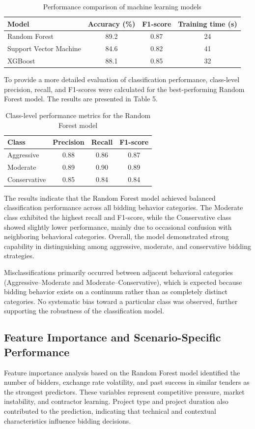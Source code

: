 \documentclass[twoside]{article}
\begin{document}
\begin{table}[ht]
	\centering
	\caption{Performance comparison of machine learning models}
	\label{tab:model_performance}
	\begin{tabular}{lccc}
		\hline
		Model & Accuracy (\%) & F1-score & Training time (s) \\
		\hline
		Random Forest & 89.2 & 0.87 & 24 \\
		Support Vector Machine & 84.6 & 0.82 & 41 \\
		XGBoost & 88.1 & 0.85 & 32 \\
		\hline
	\end{tabular}
\end{table}

To provide a more detailed evaluation of classification performance, class-level precision, recall, and F1-scores were calculated for the best-performing Random Forest model. The results are presented in Table 5.

\begin{table}[ht]
	\centering
	\caption{Class-level performance metrics for the Random Forest model}
	\begin{tabular}{lccc}
		\hline
		Class & Precision & Recall & F1-score \\
		\hline
		Aggressive & 0.88 & 0.86 & 0.87 \\
		Moderate & 0.89 & 0.90 & 0.89 \\
		Conservative & 0.85 & 0.84 & 0.84 \\
		\hline
	\end{tabular}
\end{table}

The results indicate that the Random Forest model achieved balanced classification performance across all bidding behavior categories. The Moderate class exhibited the highest recall and F1-score, while the Conservative class showed slightly lower performance, mainly due to occasional confusion with neighboring behavioral categories. Overall, the model demonstrated strong capability in distinguishing among aggressive, moderate, and conservative bidding strategies.

Misclassifications primarily occurred between adjacent behavioral categories (Aggressive--Moderate and Moderate--Conservative), which is expected because bidding behavior exists on a continuum rather than as completely distinct categories. No systematic bias toward a particular class was observed, further supporting the robustness of the classification model.

\subsection{Feature Importance and Scenario-Specific Performance}
Feature importance analysis based on the Random Forest model identified the number of bidders, exchange rate volatility, and past success in similar tenders as the strongest predictors. These variables represent competitive pressure, market instability, and contractor learning. Project type and project duration also contributed to the prediction, indicating that technical and contextual characteristics influence bidding decisions.
\end{document}
